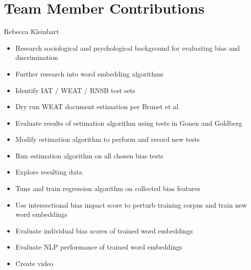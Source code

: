 \documentclass{article}
\begin{document}
\section{Team Member Contributions}

Rebecca Kleinbart
\begin{itemize}
    \item Research sociological and psychological background for
        evaluating bias and discrimination
    \item Further research into word embedding algorithms
    \item Identify IAT / WEAT / RNSB test sets
    \item Dry run WEAT document estimation per Brunet et
        al~\cite{brunet_understanding_2019}
    \item Evaluate results of estimation algorithm using tests
        in Gonen and Goldberg~\cite{gonen_lipstick_2019}
    \item Modify estimation algorithm to perform and record new tests
    \item Run estimation algorithm on all chosen bias tests
    \item Explore resulting data
    \item Tune and train regression algorithm on collected bias features
    \item Use intersectional bias impact score to perturb training
        corpus and train new word embeddings
    \item Evaluate individual bias scores of trained word embeddings
    \item Evaluate NLP performance of trained word embeddings
    \item Create video
\end{itemize}
\end{document}
